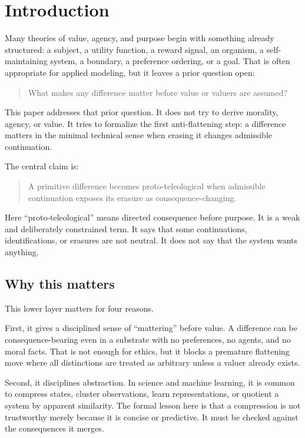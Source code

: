 \documentclass[11pt]{article}
\begin{document}
\section{Introduction}

Many theories of value, agency, and purpose begin with something already
structured: a subject, a utility function, a reward signal, an organism, a
self-maintaining system, a boundary, a preference ordering, or a goal. That is
often appropriate for applied modeling, but it leaves a prior question open:

\begin{quote}
What makes any difference matter before value or valuers are assumed?
\end{quote}

This paper addresses that prior question. It does not try to derive morality,
agency, or value. It tries to formalize the first anti-flattening step: a
difference matters in the minimal technical sense when erasing it changes
admissible continuation.

The central claim is:

\begin{quote}
A primitive difference becomes proto-teleological when admissible continuation
exposes its erasure as consequence-changing.
\end{quote}

Here ``proto-teleological'' means directed consequence before purpose. It is a
weak and deliberately constrained term. It says that some continuations,
identifications, or erasures are not neutral. It does not say that the system
wants anything.

\subsection{Why this matters}

This lower layer matters for four reasons.

First, it gives a disciplined sense of ``mattering'' before value. A difference
can be consequence-bearing even in a substrate with no preferences, no agents,
and no moral facts. That is not enough for ethics, but it blocks a premature
flattening move where all distinctions are treated as arbitrary unless a valuer
already exists.

Second, it disciplines abstraction. In science and machine learning, it is
common to compress states, cluster observations, learn representations, or
quotient a system by apparent similarity. The formal lesson here is that a
compression is not trustworthy merely because it is concise or predictive. It
must be checked against the consequences it merges.
\end{document}
